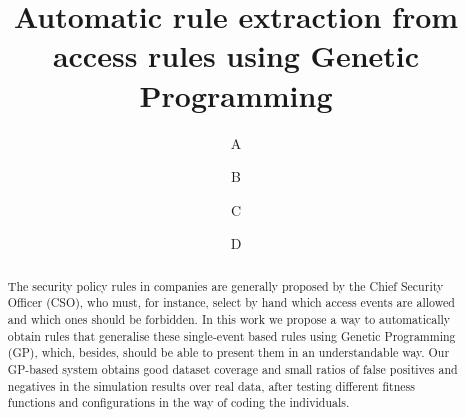 \documentclass[runningheads]{llncs}
\begin{document}
%
\title{Automatic rule extraction from access rules using Genetic Programming}

 \author{A
 \and
 B
 \and
 C
 \and
 D
}


%
%
%
%
%
\maketitle              %
%
\begin{abstract}
The security policy rules in companies are generally proposed by the
Chief Security Officer (CSO), who must, for instance, select by hand
which access events are allowed and which ones should be forbidden. In
this work we propose a way to automatically obtain rules that
generalise these single-event based rules using Genetic Programming
(GP), which, besides, should be able to present them in an
understandable way. Our GP-based system obtains good dataset coverage
and small ratios of false positives and negatives in the simulation
results over real data, after testing different fitness functions and
configurations in the way of coding the individuals.

\end{abstract}
%
%
%
\end{document}
